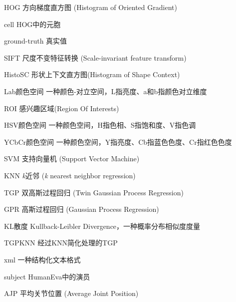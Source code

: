 \begin{denotation}

\item[HOG] 方向梯度直方图 (Histogram of Oriented Gradient)
\item[cell] HOG中的元胞
\item[ground-truth] 真实值
\item[SIFT] 尺度不变特征转换 (Scale-invariant feature transform)
\item[HistoSC] 形状上下文直方图(Histogram of Shape Context)
\item[Lab颜色空间] 一种颜色-对立空间，L指亮度、a和b指颜色对立维度
\item[ROI] 感兴趣区域(Region Of Interests)
\item[HSV颜色空间] 一种颜色空间，H指色相、S指饱和度、V指色调
\item[YCbCr颜色空间] 一种颜色空间，Y指亮度、Cb指蓝色色度、Cr指红色色度
\item[SVM] 支持向量机 (Support Vector Machine)
\item[KNN] \emph{k}近邻 (\emph{k} nearest neighbor regression)
\item[TGP] 双高斯过程回归 (Twin Gaussian Process Regression)
\item[GPR] 高斯过程回归 (Gaussian Process Regression)
\item[KL散度] Kullback-Leibler Divergence，一种概率分布相似度度量
\item[TGPKNN] 经过KNN简化处理的TGP
\item[xml] 一种结构化文本格式
\item[subject] HumanEva中的演员
\item[AJP] 平均关节位置 (Average Joint Position)

\end{denotation}
